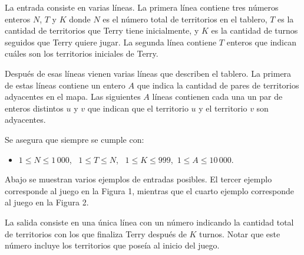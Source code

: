 \documentclass{oci}
\begin{document}
\begin{inputDescription}
  La entrada consiste en varias líneas.
%
  La primera línea contiene tres números enteros $N$, $T$ y $K$ donde
  $N$ es el número total de territorios en el tablero,
	$T$ es la cantidad de territorios que Terry tiene inicialmente, y
	$K$ es la cantidad de turnos seguidos que Terry quiere jugar.
	La segunda línea contiene $T$ enteros que indican cuáles son los territorios iniciales
	de Terry.
	
	Después de esas líneas vienen varias líneas que describen el tablero.
	La primera de estas líneas contiene un entero $A$ que indica la cantidad de 
	pares de territorios adyacentes en el mapa.
	Las siguientes $A$ líneas contienen cada una un par de enteros distintos $u$ y $v$
	que indican que el territorio $u$ y el territorio $v$ son adyacentes.
	
	Se asegura que siempre se cumple con:
	\begin{itemize}
	\item $1 \le N \le 1\,000$, \ $1 \le T\le N$, \ $1 \le K\le 999$,\  $1 \le A \le 10\,000$.
	\end{itemize}

  Abajo se muestran varios ejemplos de entradas posibles. El tercer ejemplo corresponde al
  juego en la Figura 1, mientras que el cuarto ejemplo corresponde al juego en la Figura 2.



%
%
%
%
%
\end{inputDescription}

\begin{outputDescription}
  La salida consiste en una única línea con un número indicando la cantidad total
  de territorios con los que finaliza Terry después de $K$ turnos.
  Notar que este número incluye los territorios que poseía al inicio del juego.
\end{outputDescription}
\end{document}
